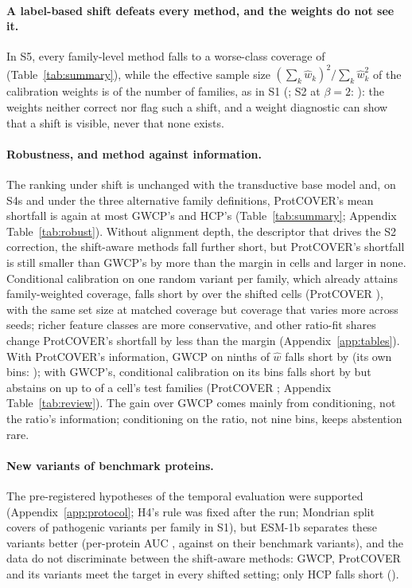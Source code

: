 \paragraph{A label-based shift defeats every method, and the weights do not see it.}
In S5, every family-level method falls to a worse-class coverage of \sFiveWorstRange{} (Table~\ref{tab:summary}), while the effective sample size $(\sum_k\hat w_k)^2/\sum_k\hat w_k^2$ of the calibration weights is \sFiveEssFrac{} of the number of families, as in S1 (\sOneEssFrac{}; S2 at $\beta=2$: \sTwoBtwoEssFrac{}): the weights neither correct nor flag such a shift, and a weight diagnostic can show that a shift is visible, never that none exists.

\paragraph{Robustness, and method against information.}
The ranking under shift is unchanged with the transductive base model and, on S4s and under the three alternative family definitions, ProtCOVER's mean shortfall is again at most GWCP's and HCP's (Table~\ref{tab:summary}; Appendix Table~\ref{tab:robust}). Without alignment depth, the descriptor that drives the S2 correction, the shift-aware methods fall further short, but ProtCOVER's shortfall is still smaller than GWCP's by more than the margin in \noMsaMarginCrGwcpBetter{} cells and larger in none. Conditional calibration on one random variant per family, which already attains family-weighted coverage, falls short by \revSubShort{} over the shifted cells (ProtCOVER \revCrShort{}), with the same set size at matched coverage but coverage that varies more across seeds; richer feature classes are more conservative, and other ratio-fit shares change ProtCOVER's shortfall by less than the margin (Appendix~\ref{app:tables}). With ProtCOVER's information, GWCP on ninths of $\hat w$ falls short by \revGwcpWShort{} (its own bins: \shortGwcpMean{}); with GWCP's, conditional calibration on its bins falls short by \revBinsShort{} but abstains on up to \revBinsAbst{} of a cell's test families (ProtCOVER \revCrAbst{}; Appendix Table~\ref{tab:review}). The gain over GWCP comes mainly from conditioning, not the ratio's information; conditioning on the ratio, not nine bins, keeps abstention rare.

\paragraph{New variants of benchmark proteins.}
The pre-registered hypotheses of the temporal evaluation were supported (Appendix~\ref{app:protocol}; H4's rule was fixed after the run; Mondrian split covers \extBtwoPath{} \extBtwoPathCI{} of pathogenic variants per family in S1), but ESM-1b separates these variants better (per-protein AUC \extAuc{}, against \extAucBench{} on their benchmark variants), and the data do not discriminate between the shift-aware methods: GWCP, ProtCOVER and its variants meet the target in every shifted setting; only HCP falls short (\extShortHcp{}).

